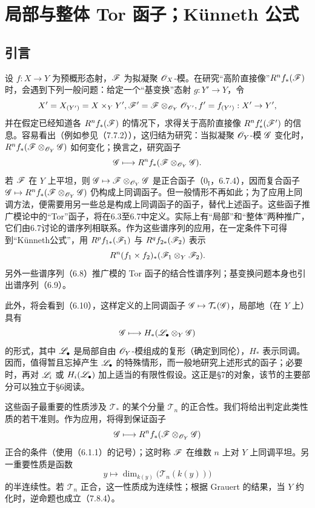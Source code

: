 \setcounter{section}{5}\section{局部与整体 Tor 函子；Künneth 公式}
\subsection{引言}
设 $f:X\to Y$ 为预概形态射，$\mathscr F$ 为拟凝聚 $\mathscr O_X$-模。在研究“高阶直接像”$R^nf_*(\mathscr F)$ 时，会遇到下列一般问题：给定一个“基变换”态射 $g:Y'\to Y$，令
\[
 X'=X_{(Y')}=X\times_Y Y',
 \mathscr F'=\mathscr F\otimes_{\mathscr O_Y}\mathscr O_{Y'},
 f'=f_{(Y')}:X'\to Y',
\]
并在假定已经知道各 $R^nf_*(\mathscr F)$ 的情况下，求得关于高阶直接像 $R^nf'_*(\mathscr F')$ 的信息。容易看出（例如参见（7.7.2）），这归结为研究：当拟凝聚 $\mathscr O_Y$-模 $\mathscr G$ 变化时，$R^nf_*(\mathscr F\otimes_{\mathscr O_Y}\mathscr G)$ 如何变化；换言之，研究函子
\[
 \mathscr G\longmapsto R^nf_*(\mathscr F\otimes_{\mathscr O_Y}\mathscr G).
\]
若 $\mathscr F$ 在 $Y$ 上平坦，则 $\mathscr G\mapsto\mathscr F\otimes_{\mathscr O_Y}\mathscr G$ 是正合函子（$0_{\mathrm I}$，6.7.4），因而复合函子 $\mathscr G\mapsto R^nf_*(\mathscr F\otimes_{\mathscr O_Y}\mathscr G)$ 仍构成上同调函子。但一般情形不再如此；为了应用上同调方法，便需要用另一些总是构成上同调函子的函子，替代上述函子。这些函子推广模论中的“Tor”函子，将在6.3至6.7中定义。实际上有“局部”和“整体”两种推广，它们由6.7讨论的谱序列相联系。作为这些谱序列的应用，在一定条件下可得到“Künneth公式”，用 $R^pf_{1*}(\mathscr F_1)$ 与 $R^qf_{2*}(\mathscr F_2)$ 表示
\[
 R^n(f_1\times f_2)_*(\mathscr F_1\otimes_Y\mathscr F_2).
\]
另外一些谱序列（6.8）推广模的 Tor 函子的结合性谱序列；基变换问题本身也引出谱序列（6.9）。

此外，将会看到（6.10），这样定义的上同调函子 $\mathscr G\mapsto\mathcal T_*(\mathscr G)$，局部地（在 $Y$ 上）具有
\[
 \mathscr G\longmapsto H_*(\mathscr L_\bullet\otimes_Y\mathscr G)
\]
的形式，其中 $\mathscr L_\bullet$ 是局部自由 $\mathscr O_Y$-模组成的复形（确定到同伦），$H_*$ 表示同调。因而，值得暂且忘掉产生 $\mathscr L_\bullet$ 的特殊情形，而一般地研究上述形式的函子；必要时，再对 $\mathscr L_i$ 或 $H_i(\mathscr L_\bullet)$ 加上适当的有限性假设。这正是§7的对象，该节的主要部分可以独立于§6阅读。

这些函子最重要的性质涉及 $\mathcal T_*$ 的某个分量 $\mathcal T_n$ 的正合性。我们将给出判定此类性质的若干准则。作为应用，将得到保证函子
\[
 \mathscr G\longmapsto R^nf_*(\mathscr F\otimes_{\mathscr O_Y}\mathscr G)
\]
正合的条件（使用（6.1.1）的记号）；这时称 $\mathscr F$ 在维数 $n$ 上对 $Y$ 上同调平坦。另一重要性质是函数
\[
 y\longmapsto\dim_{k(y)}\bigl(\mathcal T_n(k(y))\bigr)
\]
的半连续性。若 $\mathcal T_n$ 正合，这一性质成为连续性；根据 Grauert 的结果，当 $Y$ 约化时，逆命题也成立（7.8.4）。

